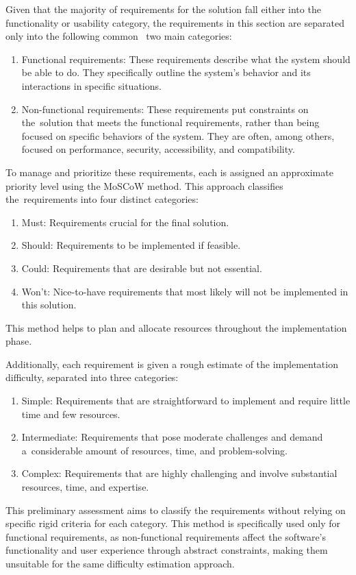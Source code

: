 Given that the majority of requirements for the solution fall either into the functionality or usability category, the requirements in this section are separated only into the following common~\cite{Aurum2005} two main categories:
\begin{enumerate}
    \item Functional requirements: These requirements describe what the system should be able to do. They specifically outline the system's behavior and its interactions in specific situations.
    \item Non-functional requirements: These requirements put constraints on the~solution that meets the functional requirements, rather than being focused on specific behaviors of the system. They are often, among others, focused on performance, security, accessibility, and compatibility.
\end{enumerate}

To manage and prioritize these requirements, each is assigned an approximate priority level using the MoSCoW method. This approach classifies the~requirements into four distinct categories:
\begin{enumerate}
    \item Must: Requirements crucial for the final solution.
    \item Should: Requirements to be implemented if feasible.
    \item Could: Requirements that are desirable but not essential.
    \item Won't: Nice-to-have requirements that most likely will not be implemented in this solution.
\end{enumerate}
This method helps to plan and allocate resources throughout the implementation phase.~\cite{Stephens2023}

\break
Additionally, each requirement is given a rough estimate of the implementation difficulty, separated into three categories: \nopagebreak
\begin{enumerate}
    \item Simple: Requirements that are straightforward to implement and require little time and few resources.
    \item Intermediate: Requirements that pose moderate challenges and demand a~considerable amount of resources, time, and problem-solving.
    \item Complex: Requirements that are highly challenging and involve substantial resources, time, and expertise.
\end{enumerate}
This preliminary assessment aims to classify the requirements without relying on specific rigid criteria for each category. This method is specifically used only for functional requirements, as non-functional requirements affect the software's functionality and user experience through abstract constraints, making them unsuitable for the same difficulty estimation approach.
